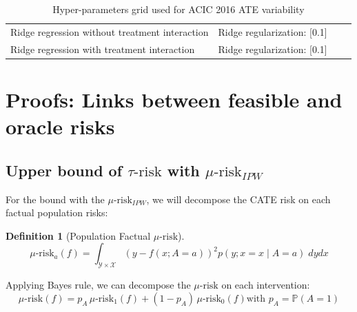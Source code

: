 \documentclass{report}
\newtheorem{definition}{Definition}
\begin{document}
\begin{appendices}
\begin{table}[h!]
{\begin{tabular}{llll}
        Ridge regression without treatment interaction & Ridge regularization:
        [0.1]                                                                  \\

        Ridge regression with treatment interaction    & Ridge regularization:
        [0.1]                                                                  \\
        \bottomrule
      \end{tabular}
    }
    \caption{Hyper-parameters grid used for ACIC 2016 ATE variability}
    \label{apd:toy_example:acic_2016_ate_variability:table}
  \end{table}



  \section{Proofs: Links between feasible and oracle risks}\label{apd:proofs}

  \subsection{Upper bound of $\tau\text{-risk}$ with
    $\mu\text{-risk}_{IPW}$}%
  \label{apd:proofs:mu_risk_ipw_bound}%

  For the bound with the $\mu\text{-risk}_{IPW}$, we will decompose the CATE risk
  on each factual population risks:

  \begin{definition}[Population Factual $\mu\text{-risk}$]\label{mu_risk_a}
    \citep{shalit_estimating_2017}
    \begin{equation*}
      \mu\text{-risk}_{a}(f)= \int_{\mathcal Y \times \mathcal X} (y-f(x ; A=a))^{2}  p(y ; x=x \mid A=a) \; dy dx
    \end{equation*}
  \end{definition}

  Applying Bayes rule, we can decompose the $\mu\text{-risk}$ on each
  intervention:
  \begin{equation*}
    \mu\text{-risk}(f)
    =p_{A} \,\mu\text{-risk}_{1}(f)+\left(1-p_{A}\right) \,\mu\text{-risk}_{0}(f)
    \text{with } p_A=\mathbb P(A=1)
  \end{equation*}


\end{appendices}
\end{document}
